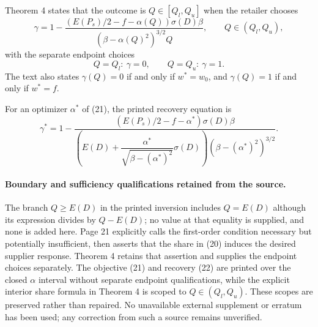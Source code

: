 \documentclass{article}
\begin{document}
Theorem 4 states that the outcome is $Q\in[Q_l,Q_u]$ when the retailer chooses
\[
\gamma=1-
\frac{(E(P_s)/2-f-\alpha(Q))\sigma(D)\beta}
{(\beta-\alpha(Q)^2)^{3/2}Q},\qquad Q\in(Q_l,Q_u),
\]
with the separate endpoint choices
\[
Q=Q_l:\ \gamma=0,\qquad Q=Q_u:\ \gamma=1.
\]
The text also states $\gamma(Q)=0$ if and only if $w^*=w_0$, and $\gamma(Q)=1$ if and only if $w^*=f$.

For an optimizer $\alpha^*$ of (21), the printed recovery equation is
\begin{equation}
\gamma^*=1-
\frac{(E(P_s)/2-f-\alpha^*)\sigma(D)\beta}
{\left(E(D)+\dfrac{\alpha^*}{\sqrt{\beta-(\alpha^*)^2}}\sigma(D)\right)
(\beta-(\alpha^*)^2)^{3/2}}.
\tag{22}
\end{equation}

\paragraph{Boundary and sufficiency qualifications retained from the source.}
The branch $Q\geq E(D)$ in the printed inversion includes $Q=E(D)$ although its expression divides by $Q-E(D)$; no value at that equality is supplied, and none is added here. Page 21 explicitly calls the first-order condition necessary but potentially insufficient, then asserts that the share in (20) induces the desired supplier response. Theorem 4 retains that assertion and supplies the endpoint choices separately. The objective (21) and recovery (22) are printed over the closed $\alpha$ interval without separate endpoint qualifications, while the explicit interior share formula in Theorem 4 is scoped to $Q\in(Q_l,Q_u)$. These scopes are preserved rather than repaired. No unavailable external supplement or erratum has been used; any correction from such a source remains unverified.
\end{document}

